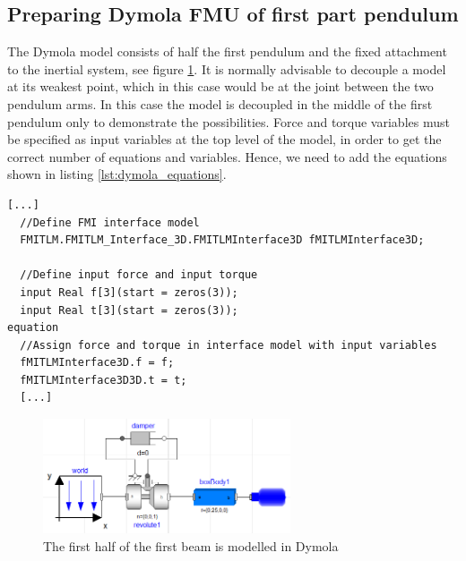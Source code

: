 \subsection{Preparing Dymola FMU of first part pendulum}

The Dymola model consists of half the first pendulum and the fixed attachment to the inertial system, see figure \ref{fig:model_dymola}.
It is normally advisable to decouple a model at its weakest point, which in this case would be at the joint between the two pendulum arms.
In this case the model is decoupled in the middle of the first pendulum only to demonstrate the possibilities.
Force and torque variables must be specified as input variables at the top level of the model, in order to get the correct number of equations and variables.
Hence, we need to add the equations shown in listing \ref{lst:dymola_equations}.

\begin{lstlisting}[language=Modelica,basicstyle=\small\ttfamily, floatplacement=ht,label=lst:dymola_equations,caption=Input variables must be specified on top level in the Modelica models]
  [...]
  //Define FMI interface model
  FMITLM.FMITLM_Interface_3D.FMITLMInterface3D fMITLMInterface3D;
  
  //Define input force and input torque
  input Real f[3](start = zeros(3));
  input Real t[3](start = zeros(3));
equation
  //Assign force and torque in interface model with input variables
  fMITLMInterface3D.f = f;
  fMITLMInterface3D3D.t = t;
  [...]
\end{lstlisting}

\begin{figure}[ht]
\centering
\includegraphics[width=0.65\textwidth]{figs/model_dymola.png}
\caption{The first half of the first beam is modelled in Dymola}
\label{fig:model_dymola}
\end{figure}

